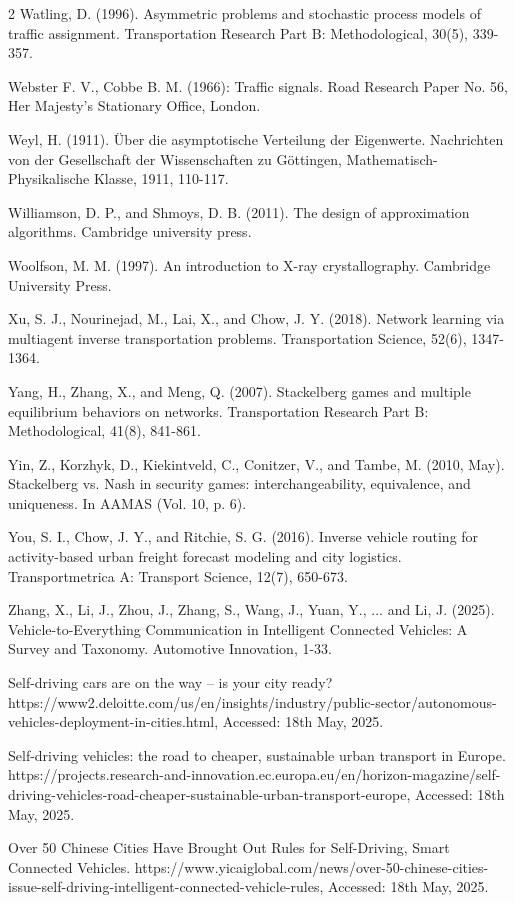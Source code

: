 \documentclass[a4paper,11pt]{article}
\begin{document}
\begin{thebibliography}{2}
 Watling, D. (1996). Asymmetric problems and stochastic process models of traffic assignment. Transportation Research Part B: Methodological, 30(5), 339-357.

Webster F. V., Cobbe B. M. (1966): Traffic signals. Road Research Paper No. 56, Her Majesty’s Stationary 
Office, London. 

 Weyl, H. (1911). \"Uber die asymptotische Verteilung der Eigenwerte. Nachrichten von der Gesellschaft der Wissenschaften zu G\"ottingen, Mathematisch-Physikalische Klasse, 1911, 110-117.

 Williamson, D. P., and Shmoys, D. B. (2011). The design of approximation algorithms. Cambridge university press.

 Woolfson, M. M. (1997). An introduction to X-ray crystallography. Cambridge University Press.


 Xu, S. J., Nourinejad, M., Lai, X., and Chow, J. Y. (2018). Network learning via multiagent inverse transportation problems. Transportation Science, 52(6), 1347-1364.


 Yang, H., Zhang, X., and Meng, Q. (2007). Stackelberg games and multiple equilibrium behaviors on networks. Transportation Research Part B: Methodological, 41(8), 841-861.

 Yin, Z., Korzhyk, D., Kiekintveld, C., Conitzer, V., and Tambe, M. (2010, May). Stackelberg vs. Nash in security games: interchangeability, equivalence, and uniqueness. In AAMAS (Vol. 10, p. 6).

 You, S. I., Chow, J. Y., and Ritchie, S. G. (2016). Inverse vehicle routing for activity-based urban freight forecast modeling and city logistics. Transportmetrica A: Transport Science, 12(7), 650-673.


 Zhang, X., Li, J., Zhou, J., Zhang, S., Wang, J., Yuan, Y., ... and Li, J. (2025). Vehicle-to-Everything Communication in Intelligent Connected Vehicles: A Survey and Taxonomy. Automotive Innovation, 1-33.

 Self-driving cars are on the way -- is your city ready?  https://www2.deloitte.com/us/en/insights/industry/public-sector/autonomous-vehicles-deployment-in-cities.html, Accessed: 18th May, 2025.

 Self-driving vehicles: the road to cheaper, sustainable urban transport in Europe. https://projects.research-and-innovation.ec.europa.eu/en/horizon-magazine/self-driving-vehicles-road-cheaper-sustainable-urban-transport-europe, Accessed: 18th May, 2025.

 Over 50 Chinese Cities Have Brought Out Rules for Self-Driving, Smart Connected Vehicles. https://www.yicaiglobal.com/news/over-50-chinese-cities-issue-self-driving-intelligent-connected-vehicle-rules, Accessed: 18th May, 2025. 

\end{thebibliography}
\end{document}
